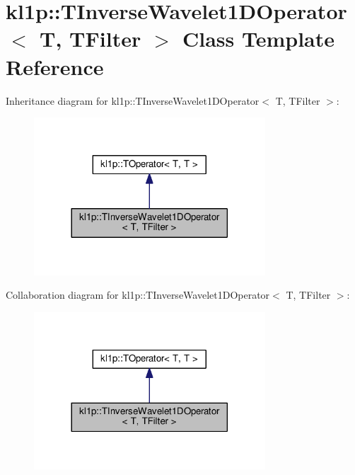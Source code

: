 \hypertarget{classkl1p_1_1TInverseWavelet1DOperator}{}\section{kl1p\+:\+:T\+Inverse\+Wavelet1\+D\+Operator$<$ T, T\+Filter $>$ Class Template Reference}
\label{classkl1p_1_1TInverseWavelet1DOperator}


Inheritance diagram for kl1p\+:\+:T\+Inverse\+Wavelet1\+D\+Operator$<$ T, T\+Filter $>$\+:
\nopagebreak
\begin{figure}[H]
\begin{center}
\leavevmode
\includegraphics[width=245pt]{classkl1p_1_1TInverseWavelet1DOperator__inherit__graph}
\end{center}
\end{figure}


Collaboration diagram for kl1p\+:\+:T\+Inverse\+Wavelet1\+D\+Operator$<$ T, T\+Filter $>$\+:
\nopagebreak
\begin{figure}[H]
\begin{center}
\leavevmode
\includegraphics[width=245pt]{classkl1p_1_1TInverseWavelet1DOperator__coll__graph}
\end{center}
\end{figure}
